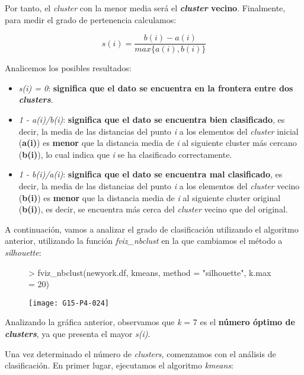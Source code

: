 \documentclass [a4paper] {article}
\begin{document}
Por tanto, el \textit{cluster} con la menor media será el \textbf{\textit{cluster} vecino}.
Finalmente, para medir el grado de pertenencia calculamos:

\begin{equation*}
s(i) = \frac{b(i) - a(i)}{max\{a(i),b(i)\}}
\end{equation*}

Analicemos los posibles resultados:
\begin{itemize}
  \item \textit{s(i) = 0}: \textbf{significa que el dato se encuentra en la frontera entre dos \textit{clusters}}.
  \item \textit{1 - a(i)/b(i)}: \textbf{significa que el dato se encuentra bien clasificado}, es decir, la media de las distancias del punto \textit{i} a los elementos del \textit{cluster} inicial (\textbf{a(i)}) es \textbf{menor} que la distancia media de \textit{i} al siguiente cluster más cercano (\textbf{b(i)}), lo cual indica que \textit{i} se ha clasificado correctamente.
  \item \textit{1 - b(i)/a(i)}: \textbf{significa que el dato se encuentra mal clasificado}, es decir, la media de las distancias del punto \textit{i} a los elementos del \textit{cluster} vecino (\textbf{b(i)}) es \textbf{menor} que la distancia media de \textit{i} al siguiente cluster original (\textbf{b(i)}), es decir, se encuentra más cerca del \textit{cluster} vecino que del original.
\end{itemize}

A continuación, vamos a analizar el grado de clasificación utilizando el algoritmo anterior, utilizando la función \textit{fviz\_nbclust} en la que cambiamos el método a \textit{silhouette}:
\begin{figure}[h!]
\centering
\begin{Schunk}
\begin{Sinput}
> fviz_nbclust(newyork.df, kmeans, method = "silhouette", k.max = 20)
\end{Sinput}
\end{Schunk}
\texttt{[image: G15-P4-024]}
\end{figure}

\newpage
Analizando la gráfica anterior, observamos que \textit{k} = 7 es el \textbf{número óptimo de \textit{clusters}}, ya que presenta el mayor \textit{s(i)}.

Una vez determinado el número de \textit{clusters}, comenzamos con el análisis de clasificación. En primer lugar, ejecutamos el algoritmo \textit{kmeans}:
\end{document}

